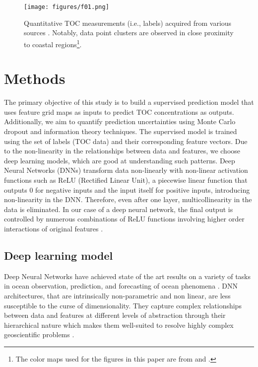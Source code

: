 \documentclass[journal abbreviation, manuscript]{copernicus}
\begin{document}
\begin{figure}[!htb]
    \texttt{[image: figures/f01.png]}
    \caption{Quantitative TOC measurements (i.e., labels) acquired from various sources \citep{SEITER20042001, romankevich2009organic, mosaic, beazley2003significance, mosaicv2}. Notably, data point clusters are observed in close proximity to coastal regions\footnote{The color maps used for the figures in this paper are from \cite{fabiocramericolormap} and \cite{cmoceancolormap}.}.}
    \label{fig:toclabels}
\end{figure}




\section{Methods}
\label{sec:methods}

The primary objective of this study is to build a supervised prediction model that uses feature grid maps as inputs to predict TOC concentrations as outputs. Additionally, we aim to quantify prediction uncertainties using Monte Carlo dropout and information theory techniques. The supervised model is trained using the set of labels (TOC data) and their corresponding feature vectors. Due to the non-linearity in the relationships between data and features, we choose deep learning models, which are good at understanding such patterns. Deep Neural Networks (DNNs) transform data non-linearly with non-linear activation functions such as ReLU (Rectified Linear Unit), a piecewise linear function that outputs 0 for negative inputs and the input itself for positive inputs, introducing non-linearity in the DNN. Therefore, even after one layer, multicollinearity in the data is eliminated. In our case of a deep neural network, the final output is controlled by  numerous combinations of ReLU functions involving higher order interactions of original features  \citep{devaux1994}.


\subsection{Deep learning model}
Deep Neural Networks have achieved state of the art results on a variety of tasks in ocean observation, prediction, and forecasting of ocean phenomena \citep{reviewAIinMarineScience}. DNN architectures, that are intrinsically non-parametric and non linear, are less susceptible to the curse of dimensionality. They capture complex relationships between data and features at different levels of abstraction through their hierarchical nature which makes them well-suited to resolve highly complex geoscientific problems \citep{LeCun2015}. 
\end{document}
